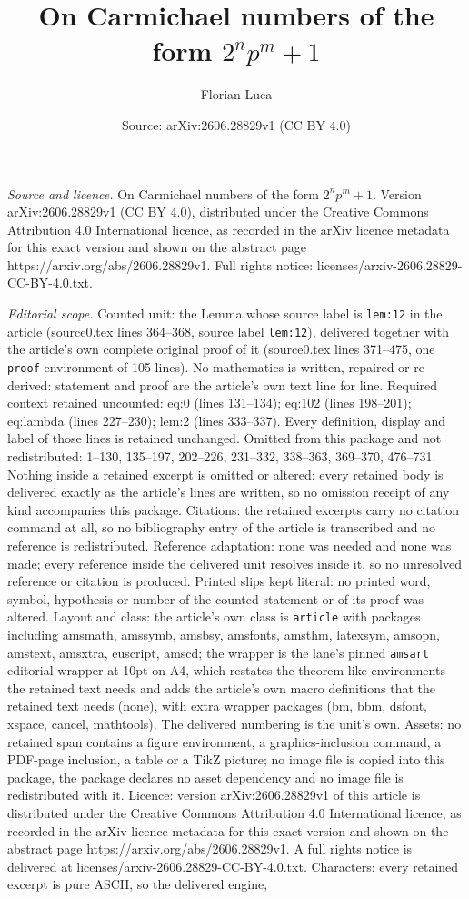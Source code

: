 \documentclass[10pt,a4paper]{amsart}
\title[On Carmichael numbers of the form $2^np^m+1$]{On Carmichael numbers of the form $2^np^m+1$}
\author{Florian Luca}
\date{Source: arXiv:2606.28829v1 (CC BY 4.0)}
\begin{document}
\maketitle

\noindent\emph{Source and licence.} On Carmichael numbers of the form $2^np^m+1$. Version arXiv:2606.28829v1 (CC BY 4.0), distributed under the Creative Commons Attribution 4.0 International licence, as recorded in the arXiv licence metadata for this exact version and shown on the abstract page https://arxiv.org/abs/2606.28829v1. Full rights notice: licenses/arxiv-2606.28829-CC-BY-4.0.txt.\par\smallskip

\noindent\textit{Editorial scope.} Counted unit: the Lemma whose source label is \texttt{lem:12} in the article (source0.tex lines 364--368, source label \texttt{lem:12}), delivered together with the article's own complete original proof of it (source0.tex lines 371--475, one \texttt{proof} environment of 105 lines). No mathematics is written, repaired or re-derived: statement and proof are the article's own text line for line. Required context retained uncounted: eq:0 (lines 131--134); eq:102 (lines 198--201); eq:lambda (lines 227--230); lem:2 (lines 333--337). Every definition, display and label of those lines is retained unchanged. Omitted from this package and not redistributed: 1--130, 135--197, 202--226, 231--332, 338--363, 369--370, 476--731. Nothing inside a retained excerpt is omitted or altered: every retained body is delivered exactly as the article's lines are written, so no omission receipt of any kind accompanies this package. Citations: the retained excerpts carry no citation command at all, so no bibliography entry of the article is transcribed and no reference is redistributed. Reference adaptation: none was needed and none was made; every reference inside the delivered unit resolves inside it, so no unresolved reference or citation is produced. Printed slips kept literal: no printed word, symbol, hypothesis or number of the counted statement or of its proof was altered. Layout and class: the article's own class is \texttt{article} with packages including amsmath, amssymb, amsbsy, amsfonts, amsthm, latexsym, amsopn, amstext, amsxtra, euscript, amscd; the wrapper is the lane's pinned \texttt{amsart} editorial wrapper at 10pt on A4, which restates the theorem-like environments the retained text needs and adds the article's own macro definitions that the retained text needs (none), with extra wrapper packages (bm, bbm, dsfont, xspace, cancel, mathtools). The delivered numbering is the unit's own. Assets: no retained span contains a figure environment, a graphics-inclusion command, a PDF-page inclusion, a table or a TikZ picture; no image file is copied into this package, the package declares no asset dependency and no image file is redistributed with it. Licence: version arXiv:2606.28829v1 of this article is distributed under the Creative Commons Attribution 4.0 International licence, as recorded in the arXiv licence metadata for this exact version and shown on the abstract page https://arxiv.org/abs/2606.28829v1. A full rights notice is delivered at licenses/arxiv-2606.28829-CC-BY-4.0.txt. Characters: every retained excerpt is pure ASCII, so the delivered engine, 
\end{document}
